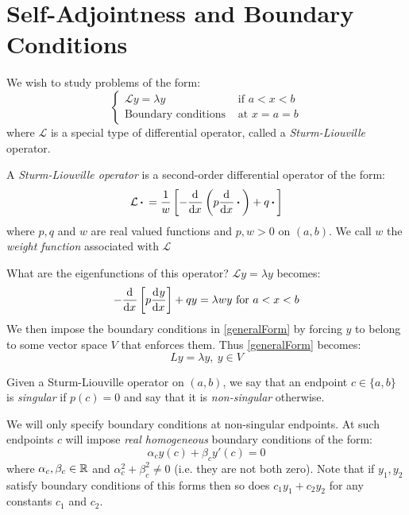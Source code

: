 \documentclass[../main.tex]{subfiles}
\begin{document}
\section{Self-Adjointness and Boundary Conditions} \label{selfAdjAndBCs}
We wish to study problems of the form:
\begin{equation}
  \begin{cases}
  \mathcal{L}y = \lambda y & \text{ if } a < x < b \\
  \text{Boundary conditions} & \text{ at } x = a = b
  \end{cases} \label{generalForm}
\end{equation}
where $\mathcal{L}$ is a special type of differential operator, called a \textit{Sturm-Liouville} operator.
\begin{definition}
  A \textit{Sturm-Liouville operator} is a second-order differential operator of the form:
  \[
    \mathcal{L} \argdot = \frac{1}{w}\left[-\deriv{}{x}\left(p \deriv{}{x} \argdot\right) + q \argdot\right]
  \]
  where $p, q$ and $w$ are real valued functions and $p, w > 0$ on $(a, b)$.
  We call $w$ the \textit{weight function} associated with $\mathcal{L}$
\end{definition}
What are the eigenfunctions of this operator?
$\mathcal{L} y = \lambda y$ becomes:
\[
  -\deriv{}{x}\left[p \deriv{y}{x}\right] + qy = \lambda w y \text{ for } a < x < b
\]
We then impose the boundary conditions in \cref{generalForm} by forcing $y$ to belong to some vector space $V$ that enforces them.
Thus \cref{generalForm} becomes:
\[
  Ly = \lambda y,\ y \in V
\]
\begin{definition}
  Given a Sturm-Liouville operator on $(a, b)$, we say that an endpoint $c \in \{a, b\}$ is \textit{singular} if $p(c) = 0$ and say that it is \textit{non-singular} otherwise.
\end{definition}
We will only specify boundary conditions at non-singular endpoints.
At such endpoints $c$ will impose \textit{real homogeneous} boundary conditions of the form:
\[
  \alpha_c y(c) + \beta_c y'(c) = 0
\]
where $\alpha_c, \beta_c \in \mathbb{R}$ and $\alpha^2_c + \beta^2_c \neq 0$ (i.e. they are not both zero).
Note that if $y_1, y_2$ satisfy boundary conditions of this forms then so does $c_1 y_1 + c_2 y_2$ for any constants $c_1$ and $c_2$.
\end{document}
